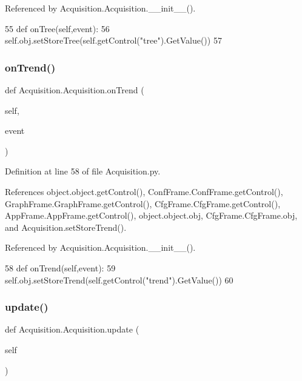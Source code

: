 Referenced by Acquisition.\+Acquisition.\+\_\+\+\_\+init\+\_\+\+\_\+().


\begin{DoxyCode}
55     \textcolor{keyword}{def }onTree(self,event):
56         self.obj.setStoreTree(self.getControl(\textcolor{stringliteral}{"tree"}).GetValue())
57 
\end{DoxyCode}
\mbox{\label{classAcquisition_1_1Acquisition_adde3ae2fd3eff1e113bd20651c8561a3}} 
\subsubsection{\texorpdfstring{on\+Trend()}{onTrend()}}
{\footnotesize\ttfamily def Acquisition.\+Acquisition.\+on\+Trend (\begin{DoxyParamCaption}\item[{}]{self,  }\item[{}]{event }\end{DoxyParamCaption})}



Definition at line 58 of file Acquisition.\+py.



References object.\+object.\+get\+Control(), Conf\+Frame.\+Conf\+Frame.\+get\+Control(), Graph\+Frame.\+Graph\+Frame.\+get\+Control(), Cfg\+Frame.\+Cfg\+Frame.\+get\+Control(), App\+Frame.\+App\+Frame.\+get\+Control(), object.\+object.\+obj, Cfg\+Frame.\+Cfg\+Frame.\+obj, and Acquisition.\+set\+Store\+Trend().



Referenced by Acquisition.\+Acquisition.\+\_\+\+\_\+init\+\_\+\+\_\+().


\begin{DoxyCode}
58     \textcolor{keyword}{def }onTrend(self,event):
59         self.obj.setStoreTrend(self.getControl(\textcolor{stringliteral}{"trend"}).GetValue())
60 
\end{DoxyCode}
\mbox{\label{classAcquisition_1_1Acquisition_abb09e973b83aec6cc4c660992b7dcc9d}} 
\subsubsection{\texorpdfstring{update()}{update()}}
{\footnotesize\ttfamily def Acquisition.\+Acquisition.\+update (\begin{DoxyParamCaption}\item[{}]{self }\end{DoxyParamCaption})}



